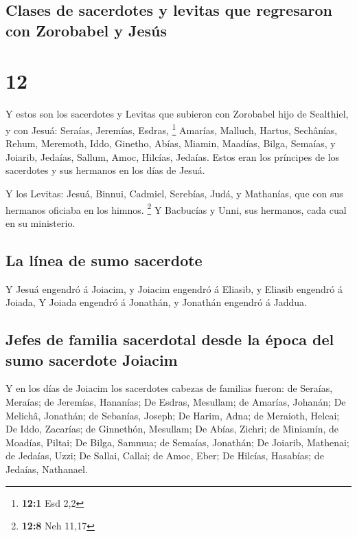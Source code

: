 \hypertarget{clases-de-sacerdotes-y-levitas-que-regresaron-con-zorobabel-y-jesuxfas}{%
\subsection{Clases de sacerdotes y levitas que regresaron con Zorobabel
y
Jesús}\label{clases-de-sacerdotes-y-levitas-que-regresaron-con-zorobabel-y-jesuxfas}}

\hypertarget{section-11}{%
\section{12}\label{section-11}}

 Y estos son los sacerdotes y Levitas que subieron con
Zorobabel hijo de Sealthiel, y con Jesuá: Seraías, Jeremías, Esdras,
\footnote{\textbf{12:1} Esd 2,2}  Amarías, Malluch,
Hartus,  Sechânías, Rehum, Meremoth,  Iddo,
Ginetho, Abías,  Miamin, Maadías, Bilga, 
Semaías, y Joiarib, Jedaías,  Sallum, Amoc, Hilcías,
Jedaías. Estos eran los príncipes de los sacerdotes y sus hermanos en
los días de Jesuá.

 Y los Levitas: Jesuá, Binnui, Cadmiel, Serebías, Judá, y
Mathanías, que con sus hermanos oficiaba en los himnos. \footnote{\textbf{12:8}
  Neh 11,17}  Y Bacbucías y Unni, sus hermanos, cada cual
en su ministerio.

\hypertarget{la-luxednea-de-sumo-sacerdote}{%
\subsection{La línea de sumo
sacerdote}\label{la-luxednea-de-sumo-sacerdote}}

 Y Jesuá engendró á Joiacim, y Joiacim engendró á
Eliasib, y Eliasib engendró á Joiada,  Y Joiada engendró
á Jonathán, y Jonathán engendró á Jaddua.

\hypertarget{jefes-de-familia-sacerdotal-desde-la-uxe9poca-del-sumo-sacerdote-joiacim}{%
\subsection{Jefes de familia sacerdotal desde la época del sumo
sacerdote
Joiacim}\label{jefes-de-familia-sacerdotal-desde-la-uxe9poca-del-sumo-sacerdote-joiacim}}

 Y en los días de Joiacim los sacerdotes cabezas de
familias fueron: de Seraías, Meraías; de Jeremías, Hananías;
 De Esdras, Mesullam; de Amarías, Johanán;
 De Melichâ, Jonathán; de Sebanías, Joseph;
 De Harim, Adna; de Meraioth, Helcai;  De
Iddo, Zacarías; de Ginnethón, Mesullam;  De Abías,
Zichri; de Miniamín, de Moadías, Piltai;  De Bilga,
Sammua; de Semaías, Jonathán;  De Joiarib, Mathenai; de
Jedaías, Uzzi;  De Sallai, Callai; de Amoc, Eber;
 De Hilcías, Hasabías; de Jedaías, Nathanael.

